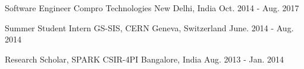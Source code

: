 

\begin{cventries}

  \cventry
    {Software Engineer} %
    {Compro Technologies} %
    {New Delhi, India} %
    {Oct. 2014 - Aug. 2017} %
    {
      \begin{cvitems} %
      \end{cvitems}
    }    

  \cventry
    {Summer Student Intern} %
    {GS-SIS, CERN} %
    {Geneva, Switzerland} %
    {June. 2014 - Aug. 2014} %
    {
      \begin{cvitems} %
      \end{cvitems}
    }    

  \cventry
    {Research Scholar, SPARK} %
    {CSIR-4PI} %
    {Bangalore, India} %
    {Aug. 2013 - Jan. 2014} %
    {
      \begin{cvitems} %
      \end{cvitems}
    }    

\end{cventries}
